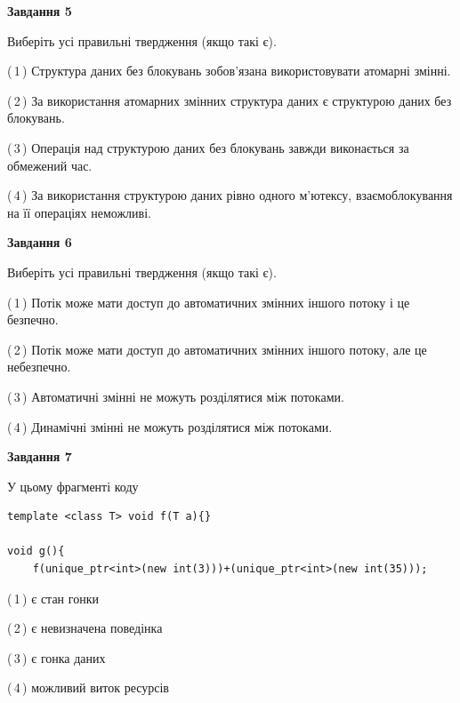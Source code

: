 \documentclass[12pt, ukrainian]{article}
\begin{document}
\begin {large}
{\begin{center}
\textbf{Завдання 5}
\end{center}

Виберіть усі правильні твердження (якщо такі є).\par
\vspace{2mm}

(\,1\,) Структура даних без блокувань зобов’язана використовувати атомарні змінні.%

(\,2\,) За використання атомарних змінних структура даних є структурою даних без блокувань.%

(\,3\,) Операція над структурою даних без блокувань завжди виконається за обмежений час.%

(\,4\,) За використання структурою даних рівно одного м’ютексу, взаємоблокування на її операціях неможливі.%
\newpage


\begin{center}
\textbf{Завдання 6}
\end{center}

Виберіть усі правильні твердження (якщо такі є).\par
\vspace{2mm}

(\,1\,) Потік може мати доступ до автоматичних змінних іншого потоку і це безпечно.%

(\,2\,) Потік може мати доступ до автоматичних змінних іншого потоку, але це небезпечно.%

(\,3\,) Автоматичні змінні не можуть розділятися між потоками.%

(\,4\,) Динамічні змінні не можуть розділятися між потоками.%


\begin{center}
\textbf{Завдання 7}
\end{center}

У цьому фрагменті коду
\begin{verbatim}
template <class T> void f(T a){}

void g(){
    f(unique_ptr<int>(new int(3)))+(unique_ptr<int>(new int(35)));
\end{verbatim}

(\,1\,) є стан гонки%

(\,2\,) є невизначена поведінка%

(\,3\,) є гонка даних%

(\,4\,) можливий виток ресурсів%

}
\end {large}

\vspace{4mm}
\newpage
\end{document}
